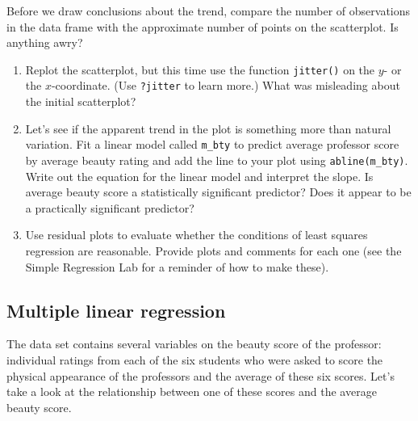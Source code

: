 \documentclass[
]{article}
\newenvironment{Shaded}{\begin{snugshade}}{\end{snugshade}}
\newcommand{\KeywordTok}[1]{\textcolor[rgb]{0.13,0.29,0.53}{\textbf{#1}}}
\newcommand{\NormalTok}[1]{#1}
\newcommand{\OperatorTok}[1]{\textcolor[rgb]{0.81,0.36,0.00}{\textbf{#1}}}
\newcommand{\StringTok}[1]{\textcolor[rgb]{0.31,0.60,0.02}{#1}}
\begin{document}
\begin{Shaded}
\end{Shaded}

Before we draw conclusions about the trend, compare the number of
observations in the data frame with the approximate number of points on
the scatterplot. Is anything awry?

\begin{enumerate}
\def\labelenumi{\arabic{enumi}.}
\setcounter{enumi}{3}
\item
  Replot the scatterplot, but this time use the function
  \texttt{jitter()} on the \(y\)- or the \(x\)-coordinate. (Use
  \texttt{?jitter} to learn more.) What was misleading about the initial
  scatterplot?
\item
  Let's see if the apparent trend in the plot is something more than
  natural variation. Fit a linear model called \texttt{m\_bty} to
  predict average professor score by average beauty rating and add the
  line to your plot using \texttt{abline(m\_bty)}. Write out the
  equation for the linear model and interpret the slope. Is average
  beauty score a statistically significant predictor? Does it appear to
  be a practically significant predictor?
\item
  Use residual plots to evaluate whether the conditions of least squares
  regression are reasonable. Provide plots and comments for each one
  (see the Simple Regression Lab for a reminder of how to make these).
\end{enumerate}

\hypertarget{multiple-linear-regression}{%
\subsection{Multiple linear
regression}\label{multiple-linear-regression}}

The data set contains several variables on the beauty score of the
professor: individual ratings from each of the six students who were
asked to score the physical appearance of the professors and the average
of these six scores. Let's take a look at the relationship between one
of these scores and the average beauty score.

\begin{Shaded}
\end{Shaded}
\end{document}

